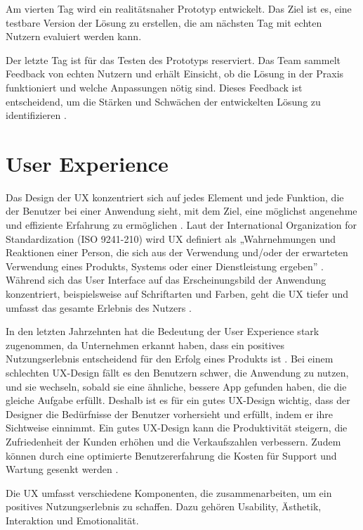 Am vierten Tag wird ein realitätsnaher Prototyp entwickelt. Das Ziel ist es, eine testbare Version der Lösung zu erstellen, die am nächsten Tag mit echten Nutzern evaluiert werden kann. 

Der letzte Tag ist für das Testen des Prototyps reserviert. Das Team sammelt Feedback von echten Nutzern und erhält Einsicht, ob die Lösung in der Praxis funktioniert und welche Anpassungen nötig sind. Dieses Feedback ist entscheidend, um die Stärken und Schwächen der entwickelten Lösung zu identifizieren \cite[S.22 ff.]{Design_Sprint}.

\section{User Experience}
Das Design der \ac{UX} konzentriert sich auf jedes Element und jede Funktion, die der Benutzer bei einer Anwendung sieht, mit dem Ziel, eine möglichst angenehme und effiziente Erfahrung zu ermöglichen \cite[S.12]{Bordegoni}. 
Laut der International Organization for Standardization (ISO 9241-210) wird UX definiert als „Wahrnehmungen und Reaktionen einer Person, die sich aus der Verwendung und/oder der erwarteten Verwendung eines Produkts, Systems oder einer Dienstleistung ergeben” \cite{iso}. 
Während sich das User Interface auf das Erscheinungsbild der Anwendung konzentriert, beispielsweise auf Schriftarten und Farben, geht die UX tiefer und umfasst das gesamte Erlebnis des Nutzers \cite[S.8]{Canziba}.

In den letzten Jahrzehnten hat die Bedeutung der User Experience stark zugenommen, da Unternehmen erkannt haben, dass ein positives Nutzungserlebnis entscheidend für den Erfolg eines Produkts ist \cite{ux_article}. 
Bei einem schlechten UX-Design fällt es den Benutzern schwer, die Anwendung zu nutzen, und sie wechseln, sobald sie eine ähnliche, bessere App gefunden haben, die die gleiche Aufgabe erfüllt. 
Deshalb ist es für ein gutes UX-Design wichtig, dass der Designer die Bedürfnisse der Benutzer vorhersieht und erfüllt, indem er ihre Sichtweise einnimmt. Ein gutes UX-Design kann die Produktivität steigern, die Zufriedenheit der Kunden erhöhen und die Verkaufszahlen verbessern. 
Zudem können durch eine optimierte Benutzererfahrung die Kosten für Support und Wartung gesenkt werden \cite[S.8 ff.]{Canziba}.

Die UX umfasst verschiedene Komponenten, die zusammenarbeiten, um ein positives Nutzungserlebnis zu schaffen. Dazu gehören Usability, Ästhetik, Interaktion und Emotionalität.

